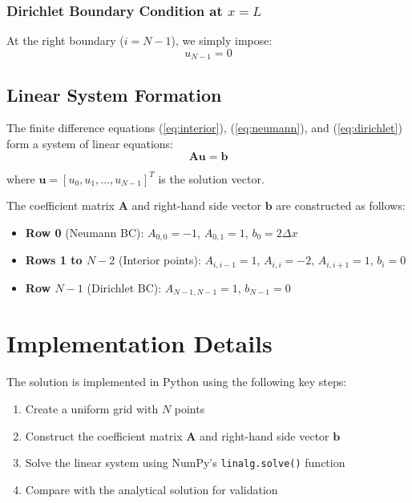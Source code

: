 \documentclass[11pt,a4paper]{article}
\begin{document}
\subsubsection{Dirichlet Boundary Condition at $x = L$}

At the right boundary ($i = N-1$), we simply impose:
\begin{equation}
u_{N-1} = 0 \label{eq:dirichlet}
\end{equation}

\subsection{Linear System Formation}

The finite difference equations (\ref{eq:interior}), (\ref{eq:neumann}), and (\ref{eq:dirichlet}) form a system of linear equations:
\begin{equation}
\mathbf{A}\mathbf{u} = \mathbf{b}
\end{equation}

where $\mathbf{u} = [u_0, u_1, \ldots, u_{N-1}]^T$ is the solution vector.

The coefficient matrix $\mathbf{A}$ and right-hand side vector $\mathbf{b}$ are constructed as follows:

\begin{itemize}
\item \textbf{Row 0} (Neumann BC): $A_{0,0} = -1$, $A_{0,1} = 1$, $b_0 = 2\Delta x$
\item \textbf{Rows 1 to $N-2$} (Interior points): $A_{i,i-1} = 1$, $A_{i,i} = -2$, $A_{i,i+1} = 1$, $b_i = 0$
\item \textbf{Row $N-1$} (Dirichlet BC): $A_{N-1,N-1} = 1$, $b_{N-1} = 0$
\end{itemize}

\section{Implementation Details}

The solution is implemented in Python using the following key steps:

\begin{enumerate}
\item Create a uniform grid with $N$ points
\item Construct the coefficient matrix $\mathbf{A}$ and right-hand side vector $\mathbf{b}$
\item Solve the linear system using NumPy's \texttt{linalg.solve()} function
\item Compare with the analytical solution for validation
\end{enumerate}
\end{document}
